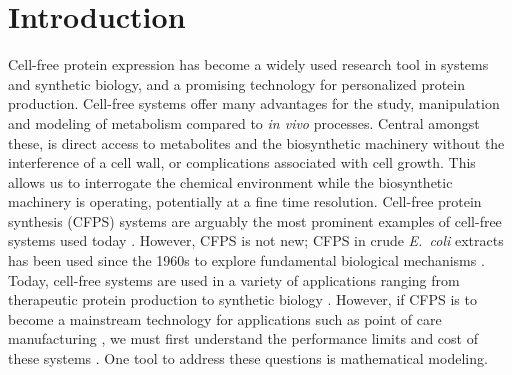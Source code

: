 \documentclass[journal=asbcd6,manuscript=article]{achemso}
\begin{document}
\section{Introduction}
Cell-free protein expression has become a widely used research tool in systems and synthetic biology, and a promising technology for personalized protein production.
Cell-free systems offer many advantages for the study, manipulation and modeling of metabolism compared to \textit{in vivo} processes.
Central amongst these, is direct access to metabolites and the biosynthetic machinery without the interference of a cell wall, or complications associated with cell growth.
This allows us to interrogate the chemical environment while the biosynthetic machinery is operating, potentially at a fine time resolution.
Cell-free protein synthesis (CFPS) systems are arguably the most prominent examples of cell-free systems used today \cite{Jewett:2008aa}.
However, CFPS is not new; CFPS in crude \textit{E.~coli} extracts has been used since the 1960s to explore fundamental biological mechanisms \cite{MATTHAEI:1961aa,NIRENBERG:1961aa}.
Today, cell-free systems are used in a variety of applications ranging from therapeutic protein production \cite{Lu:2014aa} to synthetic biology \cite{Hodgman:2012aa}.
However, if CFPS is to become a mainstream technology for applications such as point of care manufacturing \cite{Pardee2016248}, we must first understand the performance limits and cost of these systems \cite{Jewett:2008aa}.
One tool to address these questions is mathematical modeling.

\end{document}

